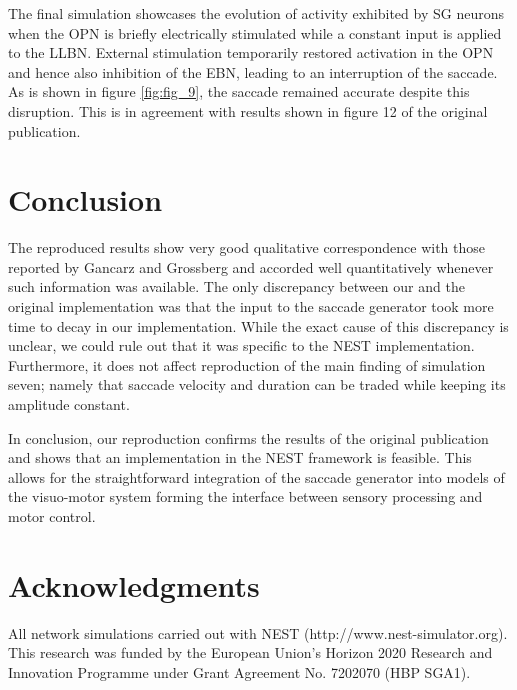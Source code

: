\documentclass[10pt,a4paper,onecolumn]{article}
\begin{document}
\clearpage

The final simulation showcases the evolution of activity exhibited by SG
neurons when the OPN is briefly electrically stimulated while a constant
input is applied to the LLBN. External stimulation temporarily restored
activation in the OPN and hence also inhibition of the EBN, leading to
an interruption of the saccade. As is shown in figure \ref{fig:fig_9},
the saccade remained accurate despite this disruption. This is in
agreement with results shown in figure 12 of the original publication.

\section{Conclusion}\label{conclusion}

The reproduced results show very good qualitative correspondence with
those reported by Gancarz and Grossberg \autocite{Gancarz1998} and
accorded well quantitatively whenever such information was available.
The only discrepancy between our and the original implementation was
that the input to the saccade generator took more time to decay in our
implementation. While the exact cause of this discrepancy is unclear, we
could rule out that it was specific to the NEST implementation.
Furthermore, it does not affect reproduction of the main finding of
simulation seven; namely that saccade velocity and duration can be
traded while keeping its amplitude constant.

In conclusion, our reproduction confirms the results of the original
publication and shows that an implementation in the NEST framework is
feasible. This allows for the straightforward integration of the saccade
generator into models of the visuo-motor system forming the interface
between sensory processing and motor control.

\section{Acknowledgments}\label{acknowledgments}

All network simulations carried out with NEST
(http://www.nest-simulator.org). This research was funded by the
European Union's Horizon 2020 Research and Innovation Programme under
Grant Agreement No. 7202070 (HBP SGA1).

{\sffamily \small
  \printbibliography[title=References]
}
\end{document}
